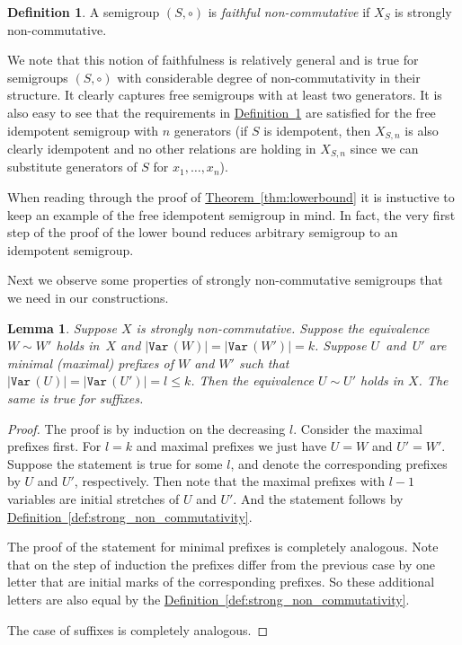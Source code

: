 \documentclass[11pt]{article}
\numberwithin{equation}{section}
\newtheorem{lemma}[theorem]{Lemma}
\theoremstyle{definition}
\newtheorem{definition}[theorem]{Definition}
\theoremstyle{plain}
\newcommand{\expref}[2]{\hyperref[#2]{#1~\ref{#2}}}
\theoremstyle{plain}\newtheorem{observation}[theorem]{Observation}
\newcommand{\var}{\texttt{Var}\,}  %
\begin{document}
\begin{definition}
	\label{def:faithful}
	A semigroup $(S, \circ)$ is \emph{faithful non-commutative} if $X_S$ is strongly
	non-commutative.
\end{definition}

We note that this notion of faithfulness is relatively general and is true for
semigroups $(S,\circ)$ with considerable degree of non-commutativity in their
structure. It clearly captures free semigroups with at least two generators. It
is also easy to see that the
requirements in \expref{Definition}{def:faithful} are satisfied for the free
idempotent semigroup with $n$ generators (if $S$ is idempotent, then $X_{S,n}$
is also clearly idempotent and no other relations are holding in $X_{S,n}$ since
we can substitute generators of $S$ for $x_1, \ldots, x_n$).

When reading through the proof of \expref{Theorem}{thm:lowerbound} it is instuctive to keep an example of the free idempotent semigroup in mind. In fact, the very first step of the proof of the lower bound reduces arbitrary semigroup to an idempotent semigroup.

Next we observe some properties of strongly non-commutative semigroups that we
need in our constructions.

%

\begin{lemma} \label{lem:prefix_equivalence}
Suppose $X$ is strongly non-commutative. Suppose the equivalence $W \sim W'$
holds in~$X$ and $|\var(W)|=|\var(W')|=k$. Suppose $U$~and~$U'$ are minimal
(maximal) prefixes of $W$ and $W'$ such that $|\var(U)| = |\var(U')| = l\leq k$.
Then the equivalence $U \sim U'$ holds in $X$. The same is true for suffixes.
\end{lemma}

\begin{proof}
The proof is by induction on the decreasing $l$. Consider the maximal prefixes
first. For $l=k$ and maximal prefixes we just have $U=W$ and $U'=W'$. Suppose
the statement is true for some $l$, and denote the corresponding prefixes by $U$
and $U'$, respectively. Then note that the maximal prefixes with $l-1$ variables
are
%
%
initial stretches %
of $U$ and $U'$. And the statement follows by
\expref{Definition}{def:strong_non_commutativity}.

The proof of the statement for minimal prefixes is completely analogous. Note
that on the step of induction the prefixes differ from the previous case by one
letter that are initial marks of the corresponding prefixes. So these additional
letters are also equal by the \expref{Definition}{def:strong_non_commutativity}.

The case of suffixes is completely analogous.
\end{proof}
\end{document}
